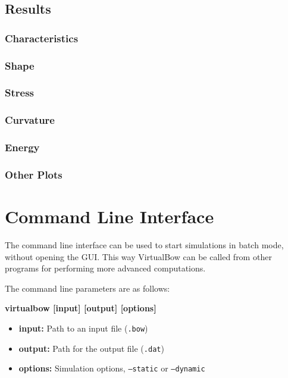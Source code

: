 \documentclass[12pt]{article}
\begin{document}
\subsection{Results}

\subsubsection{Characteristics}

\subsubsection{Shape}

\subsubsection{Stress}

\subsubsection{Curvature}

\subsubsection{Energy}

\subsubsection{Other Plots}

\newpage
\section{Command Line Interface}

The command line interface can be used to start simulations in batch mode, without opening the GUI.
This way VirtualBow can be called from other programs for performing more advanced computations.

The command line parameters are as follows:

\smallskip

\begin{framed}
\textbf{virtualbow [input] [output] [options]}
\end{framed}

\begin{itemize}
\item \textbf{input:} Path to an input file (\texttt{.bow})
\item \textbf{output:} Path for the output file (\texttt{.dat})
\item \textbf{options:} Simulation options, \texttt{--static} or \texttt{--dynamic}
\end{itemize}
\end{document}
